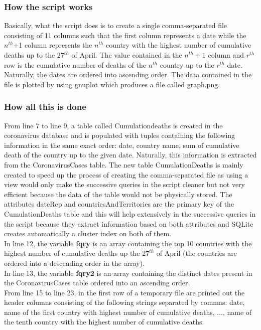 \documentclass{article}
\begin{document}
\subsubsection{How the script works}
Basically, what the script does is to create a single comma-separated file consisting of 11 columns such that the first column represents a date while the $n^{th}$+1 column represents the $n^{th}$ country with the highest number of cumulative deaths up to the $27^{th}$ of April. The value contained in the $n^{th}+1$ column and $r^{th}$ row is the cumulative number of deaths of the $n^{th}$ country up to the $r^{th}$ date. Naturally, the dates are ordered into ascending order. The data contained in the file is plotted by using gnuplot which produces a file called graph.png.
\subsubsection{How all this is done}
From line 7 to line 9, a table called Cumulationdeaths is created in the coronavirus database and is populated with tuples containing the following information in the same exact order: date, country name, sum of cumulative death of the country up to the given date. Naturally, this information is extracted from the CoronavirusCases table.
The new table CumulationDeaths is mainly created to speed up the process of creating the comma-separated file as using a view would only make the successive queries in the script cleaner but not very efficient because the data of the table would not be physically stored. The attributes dateRep and countriesAndTerritories are the primary key of the CumulationDeaths table and this will help extensively in the successive queries in the script because they extract information based on both attributes and SQLite creates automatically a cluster index on both of them.\\
In line 12, the variable \textbf{fqry} is an array containing the top 10 countries with the highest number of cumulative deaths up the $27^{th}$ of April (the countries are ordered into a descending order in the array).\\
In line 13, the variable \textbf{fqry2} is an array containing the distinct dates present in the CoronavirusCases table ordered into an ascending order.\\
From line 15 to line 23, in the first row of a temporary file are printed out the header columns consisting of the following strings separated by commas: date, name of the first country with highest number of cumulative deaths, ..., name of the tenth country with the highest number of cumulative deaths.\\
\end{document}
